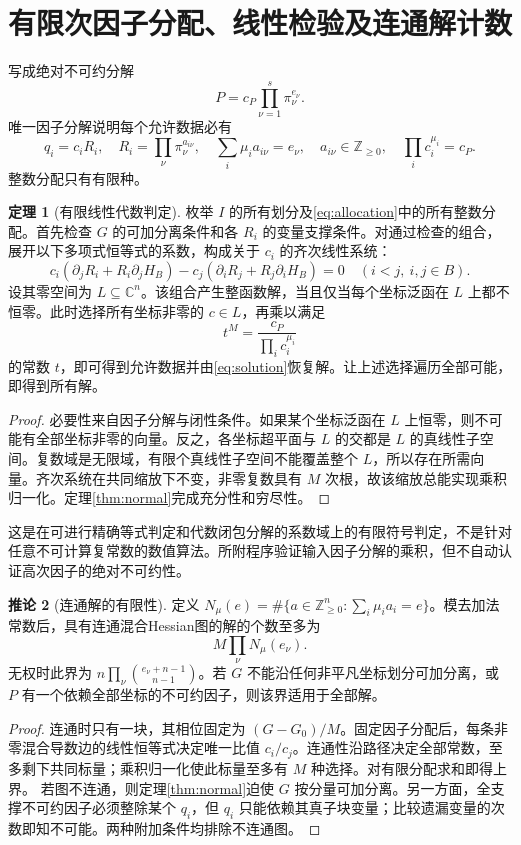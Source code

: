 \documentclass[UTF8,a4paper,zihao=-4,fontset=none]{ctexart}
\numberwithin{equation}{section}
\theoremstyle{definition}
\newtheorem{theorem}{定理}[section]
\newtheorem{corollary}[theorem]{推论}
\theoremstyle{definition}\newtheorem{definition}[theorem]{定义}
\newcommand{\C}{\mathbb C}
\newcommand{\NN}{\mathbb Z_{\ge0}}
\begin{document}
\section{有限次因子分配、线性检验及连通解计数}
写成绝对不可约分解
\[
 P=c_P\prod_{\nu=1}^s\pi_\nu^{e_\nu}.
\]
唯一因子分解说明每个允许数据必有
\begin{equation}\label{eq:allocation}
 q_i=c_iR_i,\quad R_i=\prod_\nu\pi_\nu^{a_{i\nu}},\quad
 \sum_i\mu_i a_{i\nu}=e_\nu,\quad a_{i\nu}\in\NN,
 \quad\prod_i c_i^{\mu_i}=c_P.
\end{equation}
整数分配只有有限种。

\begin{theorem}[有限线性代数判定]\label{thm:decision}
枚举 $I$ 的所有划分及\eqref{eq:allocation}中的所有整数分配。首先检查 $G$ 的可加分离条件和各 $R_i$ 的变量支撑条件。对通过检查的组合，展开以下多项式恒等式的系数，构成关于 $c_i$ 的齐次线性系统：
\[
 c_i(\partial_jR_i+R_i\partial_jH_B)
 -c_j(\partial_iR_j+R_j\partial_iH_B)=0\quad(i<j,\ i,j\in B).
\]
设其零空间为 $L\subseteq\C^n$。该组合产生整函数解，当且仅当每个坐标泛函在 $L$ 上都不恒零。此时选择所有坐标非零的 $c\in L$，再乘以满足
\[
 t^M=\frac{c_P}{\prod_i c_i^{\mu_i}}
\]
的常数 $t$，即可得到允许数据并由\eqref{eq:solution}恢复解。让上述选择遍历全部可能，即得到所有解。
\end{theorem}
\begin{proof}
必要性来自因子分解与闭性条件。如果某个坐标泛函在 $L$ 上恒零，则不可能有全部坐标非零的向量。反之，各坐标超平面与 $L$ 的交都是 $L$ 的真线性子空间。复数域是无限域，有限个真线性子空间不能覆盖整个 $L$，所以存在所需向量。齐次系统在共同缩放下不变，非零复数具有 $M$ 次根，故该缩放总能实现乘积归一化。定理\ref{thm:normal}完成充分性和穷尽性。
\end{proof}
这是在可进行精确等式判定和代数闭包分解的系数域上的有限符号判定，不是针对任意不可计算复常数的数值算法。所附程序验证输入因子分解的乘积，但不自动认证高次因子的绝对不可约性。

\begin{corollary}[连通解的有限性]\label{cor:finite}
定义 $N_\mu(e)=\#\{a\in\NN^n:\sum_i\mu_i a_i=e\}$。模去加法常数后，具有连通混合Hessian图的解的个数至多为
\[
 M\prod_\nu N_\mu(e_\nu).
\]
无权时此界为 $n\prod_\nu\binom{e_\nu+n-1}{n-1}$。若 $G$ 不能沿任何非平凡坐标划分可加分离，或 $P$ 有一个依赖全部坐标的不可约因子，则该界适用于全部解。
\end{corollary}
\begin{proof}
连通时只有一块，其相位固定为 $(G-G_0)/M$。固定因子分配后，每条非零混合导数边的线性恒等式决定唯一比值 $c_i/c_j$。连通性沿路径决定全部常数，至多剩下共同标量；乘积归一化使此标量至多有 $M$ 种选择。对有限分配求和即得上界。
若图不连通，则定理\ref{thm:normal}迫使 $G$ 按分量可加分离。另一方面，全支撑不可约因子必须整除某个 $q_i$，但 $q_i$ 只能依赖其真子块变量；比较遗漏变量的次数即知不可能。两种附加条件均排除不连通图。
\end{proof}
\end{document}
